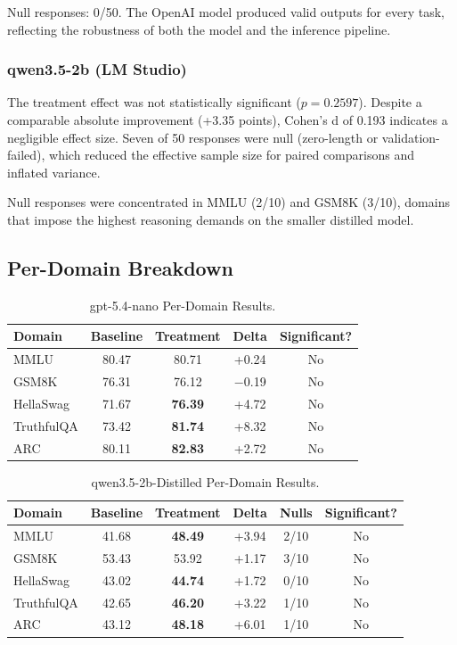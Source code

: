 \documentclass[anonymous, submission, paper]{iclr2026}
\begin{document}
Null responses: 0/50. The OpenAI model produced valid outputs for every task, reflecting the robustness of both the model and the inference pipeline.

\subsubsection{qwen3.5-2b (LM Studio)}

The treatment effect was not statistically significant ($p=0.2597$). Despite a comparable absolute improvement (+3.35 points), Cohen's d of 0.193 indicates a negligible effect size. Seven of 50 responses were null (zero-length or validation-failed), which reduced the effective sample size for paired comparisons and inflated variance.

Null responses were concentrated in MMLU (2/10) and GSM8K (3/10), domains that impose the highest reasoning demands on the smaller distilled model.

\subsection{Per-Domain Breakdown}
\label{sec:per_domain}

\begin{table}[htbp]
  \centering
  \caption{gpt-5.4-nano Per-Domain Results.}
  \begin{tabular}{@{}lcccc@{}}
    \toprule
    \textbf{Domain} & \textbf{Baseline} & \textbf{Treatment} & \textbf{Delta} & \textbf{Significant?} \\
    \midrule
    MMLU & 80.47 & 80.71 & +0.24 & No \\
    GSM8K & 76.31 & 76.12 & $-$0.19 & No \\
    HellaSwag & 71.67 & \textbf{76.39} & +4.72 & No \\
    TruthfulQA & 73.42 & \textbf{81.74} & +8.32 & No \\
    ARC & 80.11 & \textbf{82.83} & +2.72 & No \\
    \bottomrule
  \end{tabular}
  \label{tab:gpt_per_domain}
\end{table}

\begin{table}[htbp]
  \centering
  \caption{qwen3.5-2b-Distilled Per-Domain Results.}
  \begin{tabular}{@{}lccccc@{}}
    \toprule
    \textbf{Domain} & \textbf{Baseline} & \textbf{Treatment} & \textbf{Delta} & \textbf{Nulls} & \textbf{Significant?} \\
    \midrule
    MMLU & 41.68 & \textbf{48.49} & +3.94 & 2/10 & No \\
    GSM8K & 53.43 & 53.92 & +1.17 & 3/10 & No \\
    HellaSwag & 43.02 & \textbf{44.74} & +1.72 & 0/10 & No \\
    TruthfulQA & 42.65 & \textbf{46.20} & +3.22 & 1/10 & No \\
    ARC & 43.12 & \textbf{48.18} & +6.01 & 1/10 & No \\
    \bottomrule
  \end{tabular}
  \label{tab:qwen_per_domain}
\end{table}
\end{document}
